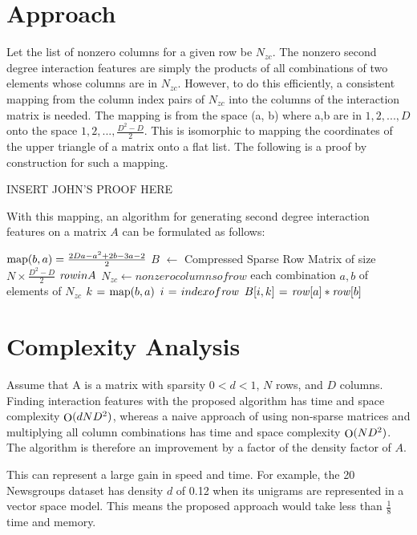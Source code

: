 \documentclass[twoside,11pt]{article}
\begin{document}
\section{Approach}
Let the list of nonzero columns for a given row be $N_{zc}$. The nonzero second degree 
interaction features are simply the products of all combinations of two elements whose 
columns are in $N_{zc}$. However, to do this efficiently, a consistent mapping from the column 
index pairs of $N_{zc}$ into the columns of the interaction matrix is needed. The mapping is 
from the space (a, b) where a,b are in $1,2,..., D$ onto the space $1,2,..., \frac{D^2-D}{2}$. This 
is isomorphic to mapping the coordinates of the upper triangle of a matrix onto a flat 
list. The following is a proof by construction for such a mapping.

INSERT JOHN'S PROOF HERE

With this mapping, an algorithm for generating second degree interaction features on a 
matrix $A$ can be formulated as follows:

\begin{codebox}
\li $\func{map}(b, a) = \frac{2Da-a^2+2b-3a-2}{2}$
\li $B$ $\gets$ Compressed Sparse Row Matrix of size $N \times \frac{D^2-D}{2}$
\li \For $\id{row} in A$
\li     $N_{zc} \gets nonzero columns of row$
\li     \For each combination $a, b$ of elements of $N_{zc}$
\li         $k \gets \func{map}(b, a)$
\li         $i \gets index of \id{row}$
\li         $B[i, k] \gets \id{row}[a] * \id{row}[b]$
        \End
    \End
\end{codebox}

\section{Complexity Analysis}
Assume that A is a matrix with sparsity $0 < d < 1$, $N$ rows, and $D$ columns. Finding 
interaction features with the proposed algorithm has time and space complexity 
$\func{O}(d N D^2)$, 
whereas a naive approach of using non-sparse matrices and multiplying all column 
combinations has time and space complexity $\func{O}(N D^2)$. The algorithm is therefore an 
improvement by a factor of the density factor of $A$.

This can represent a large gain in speed and time. For example, the 20 Newsgroups dataset 
has density $d$ of 0.12 when its unigrams are represented in a vector space model. This 
means the proposed approach would take less than $\frac{1}{8}$ time and memory.
\end{document}
